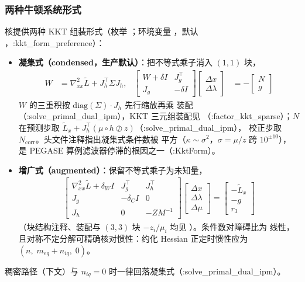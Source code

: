\subsubsection*{两种牛顿系统形式}
核提供两种 KKT 组装形式（枚举 ；环境变量
，默认 ，:kkt\_form\_preference）：
\begin{itemize}
  \item \textbf{凝集式（condensed，生产默认）}：把不等式乘子消入
        $(1,1)$ 块，
        \begin{align*}
        W &= \nabla^{2}_{xx}\tilde L + J_h^{\top}\Sigma J_h,
        &
        \begin{bmatrix} W+\delta I & J_g^{\top}\\ J_g & -\delta I\end{bmatrix}
        \begin{bmatrix}\Delta x\\ \Delta\lambda\end{bmatrix}
        &= -\begin{bmatrix} N\\ g\end{bmatrix}
        \end{align*}
        $W$ 的三重积按 $\mathrm{diag}(\Sigma)\cdot J_h$ 先行缩放再乘
        装配（:solve\_primal\_dual\_ipm），KKT 三元组装配见
        （:factor\_kkt\_sparse）；$N$ 在预测步取
        $\tilde L_x + J_h^{\top}(\mu\circ h\oslash z)$（:solve\_primal\_dual\_ipm），
        校正步取 $N_{\mathrm{corr}}$。头文件注释指出凝集式条件数被
        平方（$\kappa\sim\sigma^2$，$\sigma=\mu/z$ 跨 $10^{\pm10}$），
        是 PEGASE 算例滤波器停滞的根因之一（:KktForm）。
  \item \textbf{增广式（augmented）}：保留不等式乘子为未知量，
        \begin{align*}
        \begin{bmatrix}
        \nabla^{2}_{xx}\tilde L+\delta_W I & J_g^{\top} & J_h^{\top}\\
        J_g & -\delta_C I & 0\\
        J_h & 0 & -ZM^{-1}
        \end{bmatrix}
        \begin{bmatrix}\Delta x\\ \Delta\lambda\\ \Delta\mu\end{bmatrix}
        = \begin{bmatrix}-\tilde L_x\\ -g\\ r_3\end{bmatrix}
        \end{align*}
        （块结构注释、装配与 $(3,3)$ 块 $-z_i/\mu_i$ 均见
        ）。条件数对障碍比为
        线性，且对称不定分解可精确核对惯性：约化 Hessian 正定时惯性应为
        $(n,\;m_{eq}+n_{iq},\;0)$。
\end{itemize}
稠密路径（下文）与 $n_{iq}=0$ 时一律回落凝集式（:solve\_primal\_dual\_ipm）。


